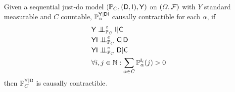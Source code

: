 \begin{theorem}\label{th:cc_ind_treat}
Given a sequential just-do model $(\mathbb{P}_C,(\mathsf{D},\mathsf{I}),\mathsf{Y})$ on $(\Omega,\mathcal{F})$ with $Y$ standard measurable and $C$ countable, $\mathbb{P}_\alpha^{\mathsf{Y}|\mathsf{DI}}$ causally contractible for each $\alpha$, if
\begin{align}
    &\RV{Y}\CI^e_{\prob{P}_C} \RV{I} | \RV{C}\\
    &\RV{YI}\CI^e_{\prob{P}_C} \RV{C}|\RV{D}\\
    &\RV{YI}\CI^e_{\prob{P}_C} \RV{D}|\RV{C}\\
    &\forall i,j\in \mathbb{N}: \sum_{\alpha\in C} \prob{P}_\alpha^{\RV{I}_i}(j)>0
\end{align}
then $\mathbb{P}_C^{\mathsf{Y}|\mathsf{D}}$ is causally contractible.
\end{theorem}

